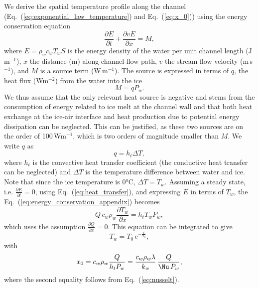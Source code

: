 We derive the spatial temperature profile along the channel (Eq.~(\ref{eq:exponential_law_temperature}) and Eq.~(\ref{eq:x_0})) using the energy conservation equation
%
\begin{equation}\label{eq:energy_conservation_appendix}
\frac{\partial E}{\partial t} + \frac{\partial vE}{\partial x} = M,
\end{equation}
%
where $E = \rho_w c_w T_w S$ is the energy density of the water per unit channel length (J\,m$^{-1}$), $x$ the distance (m) along channel-flow path, $v$ the stream flow velocity (m\,s$^{-1}$), and $M$ is a source term (W\,m$^{-1}$). The source is expressed in terms of  $q$, the heat flux (Wm$^{-2}$) from the water into the ice
\begin{equation}
  M = q P_w.
\end{equation}
%
We thus assume that the only relevant heat source is negative and stems from the consumption of energy related to ice melt at the channel wall and that both heat exchange at the ice-air interface and heat production due to potential energy dissipation can be neglected. This can be justified, as these two sources are on the order of 100\,Wm$^{-1}$, which is two orders of magnitude smaller than $M$.
We write $q$ as
\begin{equation}\label{eq:heat_transfer}
q = h_t \Delta T,
\end{equation}
where $h_t$ is the convective heat transfer coefficient (the conductive heat transfer can be neglected) and $\Delta T$ is the temperature difference between water and ice. Note that since the ice temperature is 0°C, $\Delta T = T_w$.
Assuming a steady state, i.e. $\frac{\partial E}{\partial t} = 0$, using Eq.~(\ref{eq:heat_transfer}), and expressing $E$ in terms of $T_w$, the Eq.~(\ref{eq:energy_conservation_appendix}) becomes
\begin{equation}
  Q\, c_w \rho_w \frac{\partial T_w}{\partial x} = h_t T_w P_w,
\end{equation}
which uses the assumption $\frac{\partial Q}{\partial x} = 0$.  This equation can be integrated to give
\begin{equation}
    T_w = T_0\, \mathrm{e}^{-\frac{x}{x_0}},
\end{equation}
%
with
\begin{equation}\label{eq:x0 as function of ht}
    x_0 = c_w\rho_w \frac{Q}{h_t P_w} = \frac{c_w\rho_w \lambda}{k_w} \, \frac{Q}{\Nu \, P_w},
\end{equation}
%
where the second equality follows from Eq.~(\ref{eq:nusselt}).

